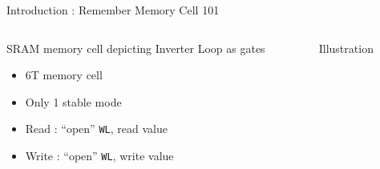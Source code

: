 \begin{Frame}{Introduction : Remember Memory Cell 101}
\begin{columns}[t]
  \begin{column}{\BW}
    \begin{block}{SRAM memory cell depicting Inverter Loop as gates}
      \begin{itemize}
      \item 6T memory cell
      \item Only 1 stable mode
      \item Read : ``open'' \texttt{WL}, read value
      \item Write : ``open'' \texttt{WL}, write value
      \end{itemize}
    \end{block}    
  \end{column}
  \begin{column}{\BW}
    \begin{block}{Illustration}
    \end{block}
  \end{column}
\end{columns}
\end{Frame}

